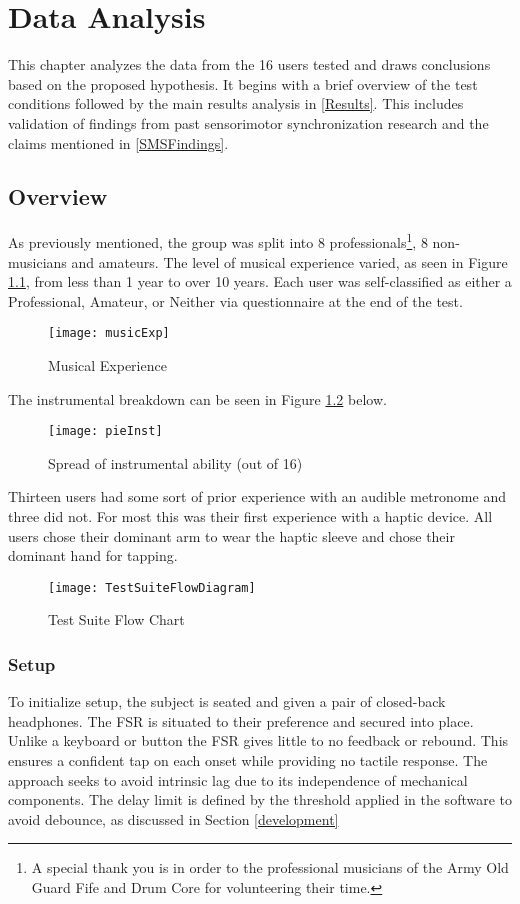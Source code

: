 \chapter{Data Analysis} \label{DataAnalysis}
This chapter analyzes the data from the 16 users tested and draws conclusions based on the proposed hypothesis. It begins with a brief overview of the test conditions followed by the main results analysis in \ref{Results}. This includes validation of findings from past sensorimotor synchronization research and the claims mentioned in \ref{SMSFindings}. 

\section{Overview}
As previously mentioned, the group was split into 8 professionals\footnote{A special thank you is in order to the professional musicians of the Army Old Guard Fife and Drum Core for volunteering their time.}, 8 non-musicians and amateurs. The level of musical experience varied, as seen in Figure \ref{fig:musicExp}, from less than 1 year to over 10 years. Each user was self-classified as either a Professional, Amateur, or Neither via questionnaire at the end of the test.
\begin{figure}[H]
    \centering
    \texttt{[image: musicExp]}
    \caption{Musical Experience}
    \label{fig:musicExp}
\end{figure}
The instrumental breakdown can be seen in Figure \ref{fig:pieInst} below.
\begin{figure}[H]
    \centering
    \texttt{[image: pieInst]}
    \caption{Spread of instrumental ability (out of 16)}
    \label{fig:pieInst}
\end{figure}
Thirteen users had some sort of prior experience with an audible metronome and three did not. For most this was their first experience with a haptic device. All users chose their dominant arm to wear the haptic sleeve and chose their dominant hand for tapping.
\begin{figure}[H]
    \centering
    \texttt{[image: TestSuiteFlowDiagram]}
    \caption{Test Suite Flow Chart}
    \label{fig:TestSuiteFlowDiagram}
\end{figure}
\subsection{Setup} \label{testSetup}
To initialize setup, the subject is seated and given a pair of closed-back headphones. The FSR is situated to their preference and secured into place. Unlike a keyboard or button the FSR gives little to no feedback or rebound. This ensures a confident tap on each onset while providing no tactile response. The approach seeks to avoid intrinsic lag due to its independence of mechanical components. The delay limit is defined by the threshold applied in the software to avoid debounce, as discussed in Section \ref{development}

